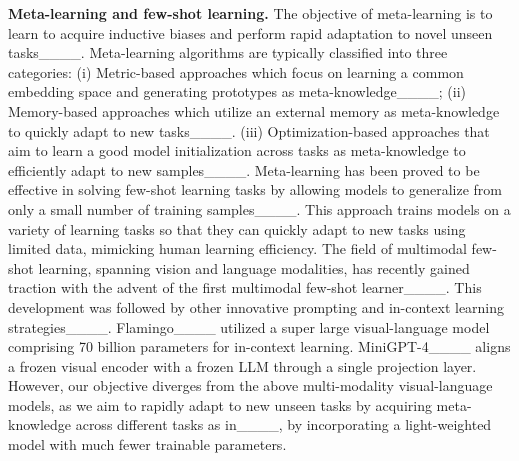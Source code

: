 \noindent \textbf{Meta-learning and few-shot learning.} 
The objective of meta-learning is to learn to acquire inductive biases and perform rapid adaptation to novel unseen tasks____. Meta-learning algorithms are typically classified into three categories: (i) Metric-based approaches which focus on learning a common embedding space and generating prototypes as meta-knowledge____; (ii) Memory-based approaches which utilize an external memory as meta-knowledge to quickly adapt to new tasks____. (iii) Optimization-based approaches that aim to learn a good model initialization across tasks as meta-knowledge to efficiently adapt to new samples____. Meta-learning has been proved to be effective in solving few-shot learning tasks by allowing models to generalize from only a small number of training samples____. This approach trains models on a variety of learning tasks so that they can quickly adapt to new tasks using limited data, mimicking human learning efficiency. The field of multimodal few-shot learning, spanning vision and language modalities, has recently gained traction with the advent of the first multimodal few-shot learner____. This development was followed by other innovative prompting and in-context learning strategies____. Flamingo____ utilized a super large visual-language model comprising 70 billion parameters for in-context learning. MiniGPT-4____ aligns a frozen visual encoder with a frozen LLM through a single projection layer. However, our objective diverges from the above multi-modality visual-language models, as we aim to rapidly adapt to new unseen tasks by acquiring meta-knowledge across different tasks as in____, by incorporating a light-weighted model with much fewer trainable parameters. 

